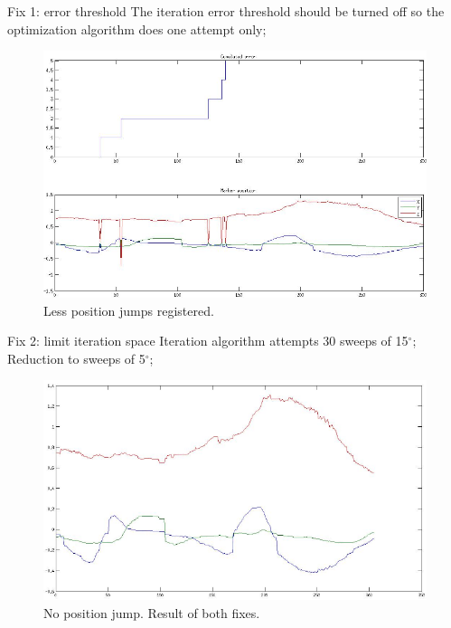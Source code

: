 \documentclass[10pt]{beamer}
\begin{document}
\begin{frame}[fragile]{Fix 1: error threshold}
  The iteration error threshold should be turned off so the optimization algorithm does one attempt only;\\
  \begin{figure}
    \centering
    \includegraphics[scale=0.35]{nothreshold.png}
    \caption{Less position jumps registered.}
  \end{figure}
\end{frame}

\begin{frame}[fragile]{Fix 2: limit iteration space}
  Iteration algorithm attempts 30 sweeps of 15$^{\circ}$;\\
  Reduction to sweeps of 5$^{\circ}$;\\
  \begin{figure}
    \centering
    \includegraphics[scale=0.35]{no-jumps}
    \caption{No position jump. Result of both fixes.}
  \end{figure}
\end{frame}
\end{document}
